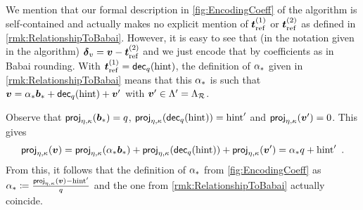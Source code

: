 \begin{remark}
We mention that our formal description in \autoref{fig:EncodingCoeff} of the algorithm is self-contained and actually makes no explicit mention of $\boldsymbol{t}_{\mathrm{ref}}^{(1)}$ or $\boldsymbol{t}_{\mathrm{ref}}^{(2)}$ as defined in \autoref{rmk:RelationshipToBabai}. However, it is easy to see that (in the notation given in the algorithm) $\boldsymbol{\delta}_v = \boldsymbol{v}-\boldsymbol{t}_{\mathrm{ref}}^{(2)}$ and we just encode that by coefficients as in Babai rounding. With $\boldsymbol{t}_{\mathrm{ref}}^{(1)}=\mathsf{dec}_{q}(\mathrm{hint})$, the definition of $\alpha_{\ast}$ given in \autoref{rmk:RelationshipToBabai} means that this $\alpha_{\ast}$ is such that $\boldsymbol{v} = \alpha_{\ast}\boldsymbol{b}_{\ast} + \mathsf{dec}_{q}(\mathrm{hint}) + \boldsymbol{v}'$ with $\boldsymbol{v}'\in\Lambda' = \Lambda_{\mathcal{R}}$.

Observe that $\mathsf{proj}_{\eta,\kappa}(\boldsymbol{b}_{\ast}) = q$, $\mathsf{proj}_{\eta,\kappa}(\mathsf{dec}_{q}(\mathrm{hint})) = \mathrm{hint}'$ and $\mathsf{proj}_{\eta,\kappa}(\boldsymbol{v}') = 0$. This gives
\[
\mathsf{proj}_{\eta,\kappa}(\boldsymbol{v}) = \mathsf{proj}_{\eta,\kappa}(\alpha_{\ast}\boldsymbol{b}_{\ast}) + \mathsf{proj}_{\eta,\kappa}(\mathsf{dec}_{q}(\mathrm{hint})) + \mathsf{proj}_{\eta,\kappa}(\boldsymbol{v}') = \alpha_{\ast} q + \mathrm{hint}'\enspace.
\]
From this, it follows that the definition of $\alpha_{\ast}$ from \autoref{fig:EncodingCoeff} as $\alpha_{\ast} \coloneqq \frac{\mathsf{proj}_{\eta,\kappa}(\boldsymbol{v})-\mathrm{hint}'}{q}$ and the one from \autoref{rmk:RelationshipToBabai} actually coincide.
\end{remark}


